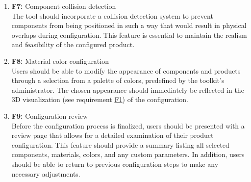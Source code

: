 \begin{enumerate}
\item \textbf{F7:} \label{itm:F7} Component collision detection
\vspace{2pt}
\\The tool should incorporate a collision detection system to prevent components from being positioned in such a way that would result in physical overlaps during configuration. This feature is essential to maintain the realism and feasibility of the configured product.
\vspace{4pt}

\item \textbf{F8:} \label{itm:F8} Material color configuration
\vspace{2pt}
\\Users should be able to modify the appearance of components and products through a selection from a palette of colors, predefined by the toolkit's administrator. The chosen appearance should immediately be reflected in the 3D visualization (see requirement \hyperref[itm:F1]{F1}) of the configuration.
\vspace{4pt}

\item \textbf{F9:} \label{itm:F9} Configuration review
\vspace{2pt}
\\Before the configuration process is finalized, users should be presented with a review page that allows for a detailed examination of their product configuration. This feature should provide a summary listing all selected components, materials, colors, and any custom parameters. In addition, users should be able to return to previous configuration steps to make any necessary adjustments.
\vspace{4pt}


\end{enumerate}
